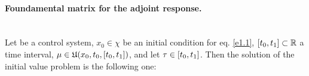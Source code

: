 \paragraph[prop 4.7]{Foundamental matrix for the adjoint response.}\mbox{}\\
 Let \controlSystem\space be a control system, $x_0\in\chi$ be an initial condition for eq. \eqref{e1.1}, $[t_0,t_1]\subset\mathbb{R}$ a time interval, $\mu\in\mathfrak{U}(x_0,t_0,[t_0,t_1])$, and let $\tau\in[t_0,t_1]$. Then the solution of the initial value problem 
is the following one:
